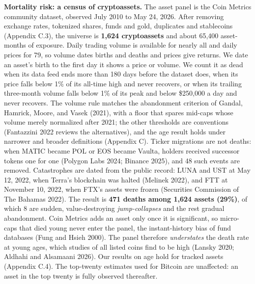 \documentclass[11pt]{article}
\begin{document}
\textbf{Mortality risk: a census of cryptoassets.} The asset panel is the Coin Metrics community dataset, observed July 2010 to May 24, 2026. After removing exchange rates, tokenized shares, funds and gold, duplicates and stablecoins (Appendix C.3), the universe is \textbf{1,624 cryptoassets} and about 65,400 asset-months of exposure. Daily trading volume is available for nearly all and daily prices for 79, so volume dates births and deaths and prices give returns. We date an asset's birth to the first day it shows a price or volume. We count it as dead when its data feed ends more than 180 days before the dataset does, when its price falls below 1\% of its all-time high and never recovers, or when its trailing three-month volume falls below 1\% of its peak and below \$250{,}000 a day and never recovers. The volume rule matches the abandonment criterion of Gandal, Hamrick, Moore, and Vasek (2021), with a floor that spares mid-caps whose volume merely normalized after 2021; the other thresholds are conventions (Fantazzini 2022 reviews the alternatives), and the age result holds under narrower and broader definitions (Appendix C). Ticker migrations are not deaths: when MATIC became POL or EOS became Vaulta, holders received successor tokens one for one (Polygon Labs 2024; Binance 2025), and 48 such events are removed. Catastrophes are dated from the public record: LUNA and UST at May 12, 2022, when Terra's blockchain was halted (Melinek 2022), and FTT at November 10, 2022, when FTX's assets were frozen (Securities Commission of The Bahamas 2022). The result is \textbf{471 deaths among 1,624 assets (29\%)}, of which 8 are sudden, value-destroying \emph{jump-collapses} and the rest gradual abandonment. Coin Metrics adds an asset only once it is significant, so micro-caps that died young never enter the panel, the instant-history bias of fund databases (Fung and Hsieh 2000). The panel therefore \emph{understates} the death rate at young ages, which studies of all listed coins find to be high (Lansky 2020; Aldhahi and Alsamaani 2026). Our results on age hold for tracked assets (Appendix C.4). The top-twenty estimates used for Bitcoin are unaffected: an asset in the top twenty is fully observed thereafter.
\end{document}
